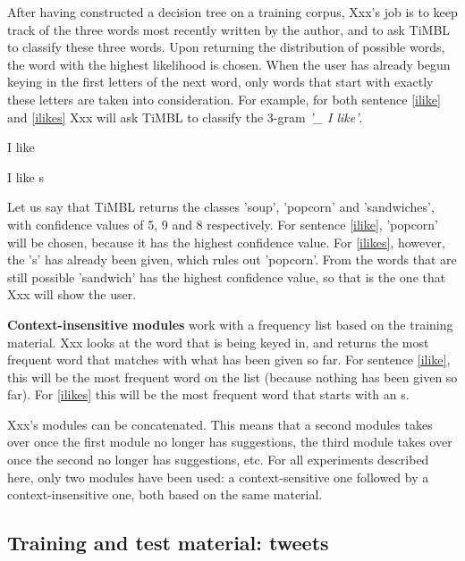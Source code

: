 \documentclass[11pt]{article}
\begin{document}
After having constructed a decision tree on a training corpus, Xxx's job is to keep track of the three words most recently written by the author, and to ask TiMBL to classify these three words. 
Upon returning the distribution of possible words, the word with the highest likelihood is chosen. When the user has already begun keying in the first letters of the next word, only words that start with exactly these letters are taken into consideration. For example, for both sentence \ref{ilike} and \ref{ilikes} Xxx will ask TiMBL to classify the 3-gram \emph{'\_ I like'}.

\begin{examples}
\item I like \label{ilike}
\item I like s \label{ilikes}
\end{examples}

Let us say that TiMBL returns the classes 'soup', 'popcorn' and 'sandwiches', with confidence values of 5, 9 and 8 respectively. For sentence \ref{ilike}, 'popcorn' will be chosen, because it has the highest confidence value. For \ref{ilikes}, however, the 's' has already been given, which rules out 'popcorn'. From the words that are still possible 'sandwich' has the highest confidence value, so that is the one that Xxx will show the user.

\textbf{Context-insensitive modules} work with a frequency list based on the training material. Xxx looks at the word that is being keyed in, and returns the most frequent word that matches with what has been given so far. For sentence \ref{ilike}, this will be the most frequent word on the list (because nothing has been given so far). For \ref{ilikes} this will be the most frequent word that starts with an s.

Xxx's modules can be concatenated. This means that a second modules takes over once the first module no longer has suggestions, the third module takes over once the second no longer has suggestions, etc. For all experiments described here, only two modules have been used: a context-sensitive one followed by a context-insensitive one, both based on the same material.

\subsection{Training and test material: tweets}
\end{document}
